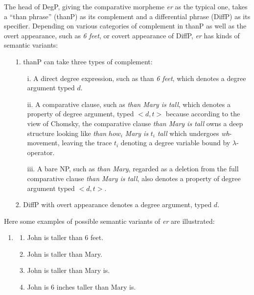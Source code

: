 \documentclass{ctexart}
\let \cite \parencite
\begin{document}
The head of DegP, giving the comparative morpheme \textit{er} as the typical one, takes a “than phrase” (thanP) as its complement and a differential phrase (DiffP) as its specifier. Depending on various categories of complement in thanP as well as the overt appearance, such as \textit{6 feet}, or covert appearance of DiffP, \textit{er} has kinds of semantic variants:

\begin{itemize}
\item[1.]
thanP can take three types of complement:

\begin{itemize}
\item[i.]
A direct degree expression, such as than \textit{6 feet}, which denotes a degree argument typed $d$.
\item[ii.]
A comparative clause, such as \textit{than Mary is tall}, which denotes a property of degree argument, typed $<d,t>$ because according to the view of Chomsky, the comparative clause \textit{than Mary is tall} owns a deep structure looking like \textit{than} $how_i$ \textit{Mary is} $t_i$ \textit{tall} which undergoes \textit{wh}-movement, leaving the trace $t_i$ denoting a degree variable bound by $\lambda$-operator\cite{chomsky1977}.
\item[iii.]
A bare NP, such as \textit{than Mary}, regarded as a deletion from the full comparative clause \textit{than Mary is tall}, also denotes a property of degree argument typed $<d,t>$.
\end{itemize}

\item[2.]
DiffP with overt appearance denotes a degree argument, typed $d$.

\end{itemize}

Here some examples of possible semantic variants of \textit{er} are illustrated:

\begin{enumerate}[resume]
\item

\begin{enumerate}
\item John is taller than 6 feet.
\item John is taller than Mary.
\item John is taller than Mary is.
\item John is 6 inches taller than Mary is.
\end{enumerate}

\end{enumerate}
\end{document}
